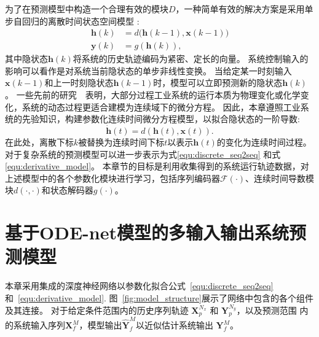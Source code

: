 为了在预测模型中构造一个合理有效的模块$D$，一种简单有效的解决方案是采用单步自回归的离散时间状态空间模型 \cite{4019326}:
\begin{equation}
    \begin{aligned}
\boldsymbol{h}(k)&=d\big(\boldsymbol{h}(k-1), \boldsymbol{x}(k-1)\big)\\
\boldsymbol{y}(k)&=g(\boldsymbol{h}(k)),
    \end{aligned}
\end{equation}
其中隐状态$\boldsymbol{h}(k)$将系统的历史轨迹编码为紧密、定长的向量。
系统控制输入的影响可以看作是对系统当前隐状态的单步非线性变换。
当给定某一时刻输入$\boldsymbol{x}(k-1)$和上一时刻隐状态$\boldsymbol{h}(k-1)$时，模型可以立即预测新的隐状态$\boldsymbol{h}(k)$。
一些先前的研究~\cite{CHAI201661}~\cite{KIM2004403}表明，大部分过程工业系统的运行本质为物理变化或化学变化，系统的动态过程更适合建模为连续域下的微分方程。
因此，本章遵照工业系统的先验知识，构建参数化连续时间微分方程模型，以拟合隐状态的一阶导数:
\begin{equation}
    \label{equ:derivative_model}
    \dot{\boldsymbol h}(t) = d(\boldsymbol{h}(t), \boldsymbol x(t)).
\end{equation}
在此处，离散下标$k$被替换为连续时间下标$t$以表示$\boldsymbol{h}(t)$的变化为连续时间过程。
对于复杂系统的预测模型可以进一步表示为式\eqref{equ:discrete_seq2seq} 和式 \eqref{equ:derivative_model}。
本章节的目标是利用收集得到的系统运行轨迹数据，对 上述模型中的各个参数化模块进行学习，包括序列编码器$\mathcal{F}(\cdot)$、连续时间导数模块$d(\cdot,\cdot)$和状态解码器$g(\cdot)$。
\section{基于ODE-net模型的多输入输出系统预测模型}
\label{sec:model}
本章采用集成的深度神经网络以参数化拟合公式~\eqref{equ:discrete_seq2seq}和~\eqref{equ:derivative_model}.
图~\ref{fig:model_structure}展示了网络中包含的各个组件及其连接。
对于给定条件范围内的历史序列轨迹 $\boldsymbol{X}_{p}^{N_{x}}$ 和 $\boldsymbol{Y}_{p}^{N_{y}}$，以及预测范围 内的系统输入序列$\boldsymbol{X}_{f}^{M}$，模型输出$\hat{\boldsymbol{Y}}_{f}^{M}$以近似估计系统输出 $\boldsymbol{Y}_{f}^{M}$。

